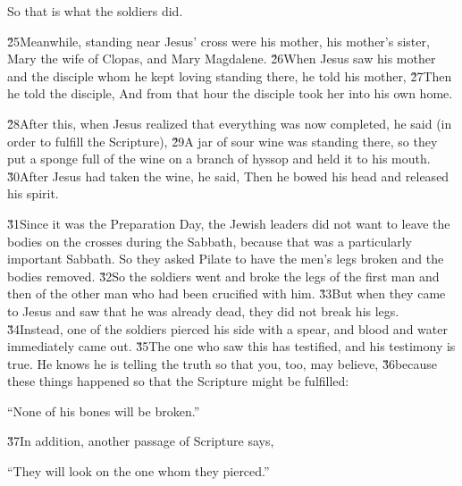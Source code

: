 So that is what the soldiers did.

\v{25}Meanwhile, standing near Jesus' cross were his mother, his mother's sister, Mary the wife of Clopas, and Mary Magdalene. \v{26}When Jesus saw his mother and the disciple whom he kept loving standing there, he told his mother,  \v{27}Then he told the disciple,  And from that hour the disciple took her into his own home.

\v{28}After this, when Jesus realized that everything was now completed, he said (in order to fulfill the Scripture),  \v{29}A jar of sour wine was standing there, so they put a sponge full of the wine on a branch of hyssop and held it to his mouth. \v{30}After Jesus had taken the wine, he said,  Then he bowed his head and released his spirit.

\v{31}Since it was the Preparation Day, the Jewish leaders did not want to leave the bodies on the crosses during the Sabbath, because that was a particularly important Sabbath. So they asked Pilate to have the men's legs broken and the bodies removed. \v{32}So the soldiers went and broke the legs of the first man and then of the other man who had been crucified with him. \v{33}But when they came to Jesus and saw that he was already dead, they did not break his legs. \v{34}Instead, one of the soldiers pierced his side with a spear, and blood and water immediately came out. \v{35}The one who saw this has testified, and his testimony is true. He knows he is telling the truth so that you, too, may believe, \v{36}because these things happened so that the Scripture might be fulfilled:

\begin{poetry}
\poeml ``None of his bones will be broken.''
\end{poetry}

\v{37}In addition, another passage of Scripture says,

\begin{poetry}
\poeml ``They will look on the one whom they pierced.''
\end{poetry}

